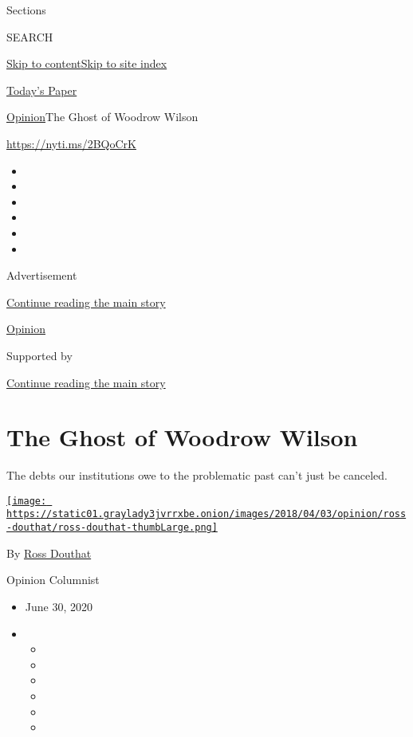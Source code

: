 Sections

SEARCH

\protect\hyperlink{site-content}{Skip to
content}\protect\hyperlink{site-index}{Skip to site index}

\href{https://myaccount.nytimes3xbfgragh.onion/auth/login?response_type=cookie\&client_id=vi}{}

\href{https://www.nytimes3xbfgragh.onion/section/todayspaper}{Today's
Paper}

\href{/section/opinion}{Opinion}\textbar{}The Ghost of Woodrow Wilson

\url{https://nyti.ms/2BQoCrK}

\begin{itemize}
\item
\item
\item
\item
\item
\item
\end{itemize}

Advertisement

\protect\hyperlink{after-top}{Continue reading the main story}

\href{/section/opinion}{Opinion}

Supported by

\protect\hyperlink{after-sponsor}{Continue reading the main story}

\hypertarget{the-ghost-of-woodrow-wilson}{%
\section{The Ghost of Woodrow
Wilson}\label{the-ghost-of-woodrow-wilson}}

The debts our institutions owe to the problematic past can't just be
canceled.

\href{https://www.nytimes3xbfgragh.onion/by/ross-douthat}{\texttt{[image: https://static01.graylady3jvrrxbe.onion/images/2018/04/03/opinion/ross-douthat/ross-douthat-thumbLarge.png]}}

By \href{https://www.nytimes3xbfgragh.onion/by/ross-douthat}{Ross
Douthat}

Opinion Columnist

\begin{itemize}
\item
  June 30, 2020
\item
  \begin{itemize}
  \item
  \item
  \item
  \item
  \item
  \item
  \end{itemize}
\end{itemize}

